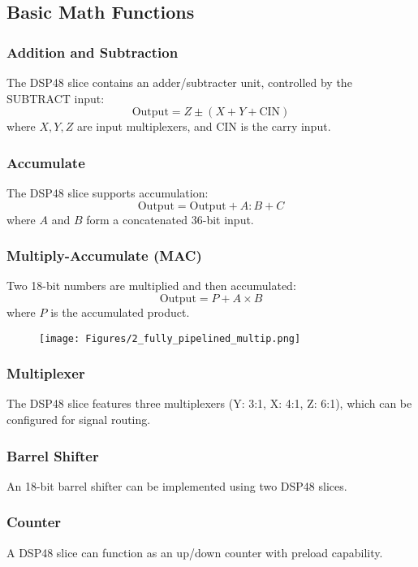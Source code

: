 \documentclass{article}
\begin{document}
	\subsection{Basic Math Functions}
	
	\subsubsection{Addition and Subtraction}
	The DSP48 slice contains an adder/subtracter unit, controlled by the SUBTRACT input:
	\[
	\text{Output} = Z \pm (X + Y + \text{CIN})
	\]
	where \(X, Y, Z\) are input multiplexers, and CIN is the carry input.
	
	\subsubsection{Accumulate}
	The DSP48 slice supports accumulation:
	\[
	\text{Output} = \text{Output} + A:B + C
	\]
	where \(A\) and \(B\) form a concatenated 36-bit input.
	
	\subsubsection{Multiply-Accumulate (MAC)}
	Two 18-bit numbers are multiplied and then accumulated:
	\[
	\text{Output} = P + A \times B
	\]
	where \(P\) is the accumulated product.
	
	\begin{figure}
		\centering
		\texttt{[image: Figures/2\_fully\_pipelined\_multip.png]}
		\label{fig:enter-label}
	\end{figure}
	
	\subsubsection{Multiplexer}
	The DSP48 slice features three multiplexers (Y: 3:1, X: 4:1, Z: 6:1), which can be configured for signal routing.
	
	\subsubsection{Barrel Shifter}
	An 18-bit barrel shifter can be implemented using two DSP48 slices.
	
	\subsubsection{Counter}
	A DSP48 slice can function as an up/down counter with preload capability.
	
\end{document}
